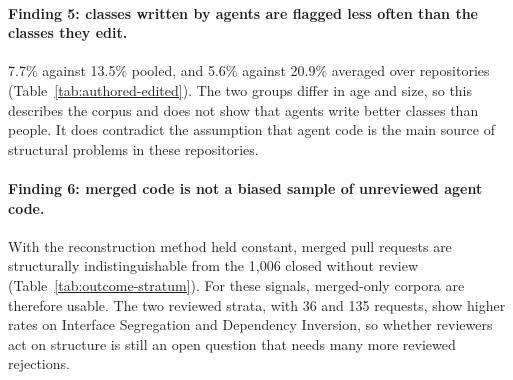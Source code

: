 \paragraph{Finding 5: classes written by agents are flagged less often than the classes they edit.}
7.7\% against 13.5\% pooled, and 5.6\% against 20.9\% averaged over repositories
(Table~\ref{tab:authored-edited}). The two groups differ in age and size, so this describes the
corpus and does not show that agents write better classes than people. It does contradict the
assumption that agent code is the main source of structural problems in these repositories.

\paragraph{Finding 6: merged code is not a biased sample of unreviewed agent code.} With the
reconstruction method held constant, merged pull requests are structurally indistinguishable from
the 1{,}006 closed without review (Table~\ref{tab:outcome-stratum}). For these signals, merged-only
corpora are therefore usable. The two reviewed strata, with 36 and 135 requests, show higher rates on
Interface Segregation and Dependency Inversion, so whether reviewers act on structure is still an
open question that needs many more reviewed rejections.


